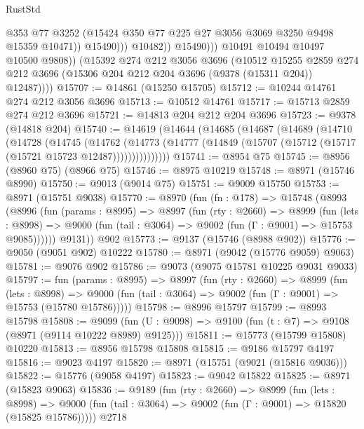 \begin{lexlean}{RustStd}
\begin{coremodule}
                            @353
                            @77
                            @3252
                            (@15424 @350 @77 @225 @27 @3056 @3069 @3250 @9498 @15359 @10471))
                          @15490)))
                    @10482))
                @15490)))
          @10491
          @10494
          @10497
          @10500
          @9808))
      (@15392
        @274
        @212
        @3056
        @3696
        (@10512
          @15255
          @2859
          @274
          @212
          @3696
          (@15306 @204 @212 @204 @3696 (@9378 (@15311 @204)) @12487))))
@15707 := @14861 (@15250 @15705)
@15712 := @10244 @14761 @274 @212 @3056 @3696
@15713 := @10512 @14761
@15717 := @15713 @2859 @274 @212 @3696
@15721 := @14813 @204 @212 @204 @3696
@15723 := @9378 (@14818 @204)
@15740 := @14619
    (@14644
      (@14685
        (@14687
          (@14689
            (@14710
              (@14728
                (@14745
                  (@14762
                    (@14773
                      (@14777 (@14849 (@15707 (@15712 (@15717 (@15721 @15723 @12487)))))))))))))))
@15741 := @8954 @75
@15745 := @8956 (@8960 @75) (@8966 @75)
@15746 := @8975 @10219
@15748 := @8971 (@15746 @8990)
@15750 := @9013 (@9014 @75)
@15751 := @9009 @15750
@15753 := @8971 (@15751 @9038)
@15770 := @8970
    (fun (fn : @178) =>
    @15748
      (@8993
        (@8996
          (fun (params : @8995) =>
          @8997
            (fun (rty : @2660) =>
            @8999
              (fun (lets : @8998) =>
              @9000 (fun (tail : @3064) => @9002 (fun (Γ : @9001) => @15753 @9085))))))
        @9131))
    @902
@15773 := @9137 (@15746 (@8988 @902))
@15776 := @9050 (@9051 @902) @10222
@15780 := @8971 (@9042 (@15776 @9059) @9063)
@15781 := @9076 @902
@15786 := @9073 (@9075 @15781 @10225 @9031 @9033)
@15797 := fun (params : @8995) =>
  @8997
    (fun (rty : @2660) =>
    @8999
      (fun (lets : @8998) =>
      @9000 (fun (tail : @3064) => @9002 (fun (Γ : @9001) => @15753 (@15780 @15786)))))
@15798 := @8996 @15797
@15799 := @8993 @15798
@15808 := @9099
    (fun (U : @9098) => @9100 (fun (t : @7) => @9108 (@8971 (@9114 @10222 @8989) @9125)))
@15811 := @15773 (@15799 @15808) @10220
@15813 := @8956 @15798 @15808
@15815 := @9186 @15797 @4197
@15816 := @9023 @4197
@15820 := @8971 (@15751 (@9021 (@15816 @9036)))
@15822 := @15776 (@9058 @4197)
@15823 := @9042 @15822
@15825 := @8971 (@15823 @9063)
@15836 := @9189
    (fun (rty : @2660) =>
    @8999
      (fun (lets : @8998) =>
      @9000 (fun (tail : @3064) => @9002 (fun (Γ : @9001) => @15820 (@15825 @15786)))))
    @2718

\end{coremodule}
\end{lexlean}
